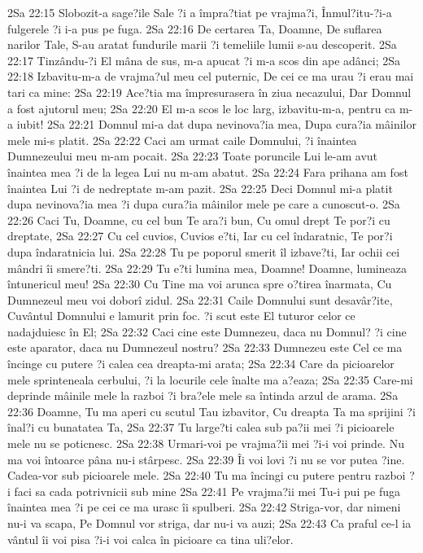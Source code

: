2Sa 22:15  Slobozit-a sage?ile Sale ?i a împra?tiat pe vrajma?i, Înmul?itu-?i-a fulgerele ?i i-a pus pe fuga.
2Sa 22:16  De certarea Ta, Doamne, De suflarea narilor Tale, S-au aratat fundurile marii ?i temeliile lumii s-au descoperit.
2Sa 22:17  Tinzându-?i El mâna de sus, m-a apucat ?i m-a scos din ape adânci;
2Sa 22:18  Izbavitu-m-a de vrajma?ul meu cel puternic, De cei ce ma urau ?i erau mai tari ca mine:
2Sa 22:19  Ace?tia ma împresurasera în ziua necazului, Dar Domnul a fost ajutorul meu;
2Sa 22:20  El m-a scos le loc larg, izbavitu-m-a, pentru ca m-a iubit!
2Sa 22:21  Domnul mi-a dat dupa nevinova?ia mea, Dupa cura?ia mâinilor mele mi-s platit.
2Sa 22:22  Caci am urmat caile Domnului, ?i înaintea Dumnezeului meu m-am pocait.
2Sa 22:23  Toate poruncile Lui le-am avut înaintea mea ?i de la legea Lui nu m-am abatut.
2Sa 22:24  Fara prihana am fost înaintea Lui ?i de nedreptate m-am pazit.
2Sa 22:25  Deci Domnul mi-a platit dupa nevinova?ia mea ?i dupa cura?ia mâinilor mele pe care a cunoscut-o.
2Sa 22:26  Caci Tu, Doamne, cu cel bun Te ara?i bun, Cu omul drept Te por?i cu dreptate,
2Sa 22:27  Cu cel cuvios, Cuvios e?ti, Iar cu cel îndaratnic, Te por?i dupa îndaratnicia lui.
2Sa 22:28  Tu pe poporul smerit îl izbave?ti, Iar ochii cei mândri îi smere?ti.
2Sa 22:29  Tu e?ti lumina mea, Doamne! Doamne, lumineaza întunericul meu!
2Sa 22:30  Cu Tine ma voi arunca spre o?tirea înarmata, Cu Dumnezeul meu voi doborî zidul.
2Sa 22:31  Caile Domnului sunt desavâr?ite, Cuvântul Domnului e lamurit prin foc. ?i scut este El tuturor celor ce nadajduiesc în El;
2Sa 22:32  Caci cine este Dumnezeu, daca nu Domnul? ?i cine este aparator, daca nu Dumnezeul nostru?
2Sa 22:33  Dumnezeu este Cel ce ma încinge cu putere ?i calea cea dreapta-mi arata;
2Sa 22:34  Care da picioarelor mele sprinteneala cerbului, ?i la locurile cele înalte ma a?eaza;
2Sa 22:35  Care-mi deprinde mâinile mele la razboi ?i bra?ele mele sa întinda arzul de arama.
2Sa 22:36  Doamne, Tu ma aperi cu scutul Tau izbavitor, Cu dreapta Ta ma sprijini ?i înal?i cu bunatatea Ta,
2Sa 22:37  Tu large?ti calea sub pa?ii mei ?i picioarele mele nu se poticnesc.
2Sa 22:38  Urmari-voi pe vrajma?ii mei ?i-i voi prinde. Nu ma voi întoarce pâna nu-i stârpesc.
2Sa 22:39  Îi voi lovi ?i nu se vor putea ?ine. Cadea-vor sub picioarele mele.
2Sa 22:40  Tu ma încingi cu putere pentru razboi ?i faci sa cada potrivnicii sub mine
2Sa 22:41  Pe vrajma?ii mei Tu-i pui pe fuga înaintea mea ?i pe cei ce ma urasc îi spulberi.
2Sa 22:42  Striga-vor, dar nimeni nu-i va scapa, Pe Domnul vor striga, dar nu-i va auzi;
2Sa 22:43  Ca praful ce-l ia vântul îi voi pisa ?i-i voi calca în picioare ca tina uli?elor.
